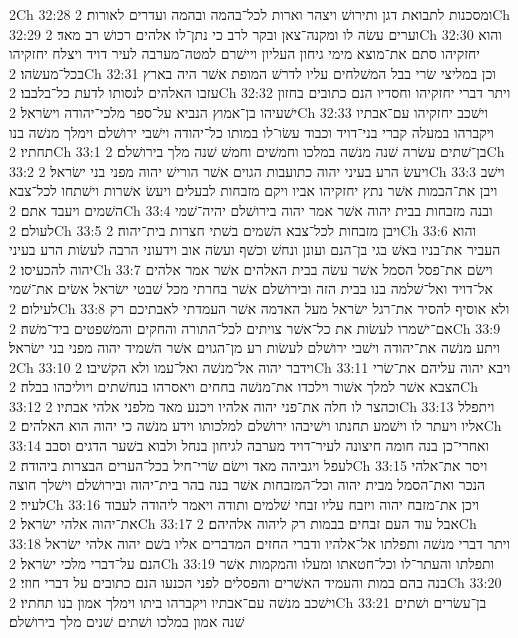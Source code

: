 2Ch 32:28  ומסכנות לתבואת דגן ותירושׁ ויצהר וארות לכל־בהמה ובהמה ועדרים לאורות׃
2Ch 32:29  וערים עשׂה לו ומקנה־צאן ובקר לרב כי נתן־לו אלהים רכושׁ רב מאד׃
2Ch 32:30  והוא יחזקיהו סתם את־מוצא מימי גיחון העליון ויישׁרם למטה־מערבה לעיר דויד ויצלח יחזקיהו בכל־מעשׂהו׃
2Ch 32:31  וכן במליצי שׂרי בבל המשׁלחים עליו לדרשׁ המופת אשׁר היה בארץ עזבו האלהים לנסותו לדעת כל־בלבבו׃
2Ch 32:32  ויתר דברי יחזקיהו וחסדיו הנם כתובים בחזון ישׁעיהו בן־אמוץ הנביא על־ספר מלכי־יהודה וישׂראל׃
2Ch 32:33  וישׁכב יחזקיהו עם־אבתיו ויקברהו במעלה קברי בני־דויד וכבוד עשׂו־לו במותו כל־יהודה וישׁבי ירושׁלם וימלך מנשׁה בנו תחתיו׃
2Ch 33:1  בן־שׁתים עשׂרה שׁנה מנשׁה במלכו וחמשׁים וחמשׁ שׁנה מלך בירושׁלם׃
2Ch 33:2  ויעשׂ הרע בעיני יהוה כתועבות הגוים אשׁר הורישׁ יהוה מפני בני ישׂראל׃
2Ch 33:3  וישׁב ויבן את־הבמות אשׁר נתץ יחזקיהו אביו ויקם מזבחות לבעלים ויעשׂ אשׁרות וישׁתחו לכל־צבא השׁמים ויעבד אתם׃
2Ch 33:4  ובנה מזבחות בבית יהוה אשׁר אמר יהוה בירושׁלם יהיה־שׁמי לעולם׃
2Ch 33:5  ויבן מזבחות לכל־צבא השׁמים בשׁתי חצרות בית־יהוה׃
2Ch 33:6  והוא העביר את־בניו באשׁ בגי בן־הנם ועונן ונחשׁ וכשׁף ועשׂה אוב וידעוני הרבה לעשׂות הרע בעיני יהוה להכעיסו׃
2Ch 33:7  וישׂם את־פסל הסמל אשׁר עשׂה בבית האלהים אשׁר אמר אלהים אל־דויד ואל־שׁלמה בנו בבית הזה ובירושׁלם אשׁר בחרתי מכל שׁבטי ישׂראל אשׂים את־שׁמי לעילום׃
2Ch 33:8  ולא אוסיף להסיר את־רגל ישׂראל מעל האדמה אשׁר העמדתי לאבתיכם רק אם־ישׁמרו לעשׂות את כל־אשׁר צויתים לכל־התורה והחקים והמשׁפטים ביד־משׁה׃
2Ch 33:9  ויתע מנשׁה את־יהודה וישׁבי ירושׁלם לעשׂות רע מן־הגוים אשׁר השׁמיד יהוה מפני בני ישׂראל׃
2Ch 33:10  וידבר יהוה אל־מנשׁה ואל־עמו ולא הקשׁיבו׃
2Ch 33:11  ויבא יהוה עליהם את־שׂרי הצבא אשׁר למלך אשׁור וילכדו את־מנשׁה בחחים ויאסרהו בנחשׁתים ויוליכהו בבלה׃
2Ch 33:12  וכהצר לו חלה את־פני יהוה אלהיו ויכנע מאד מלפני אלהי אבתיו׃
2Ch 33:13  ויתפלל אליו ויעתר לו וישׁמע תחנתו וישׁיבהו ירושׁלם למלכותו וידע מנשׁה כי יהוה הוא האלהים׃
2Ch 33:14  ואחרי־כן בנה חומה חיצונה לעיר־דויד מערבה לגיחון בנחל ולבוא בשׁער הדגים וסבב לעפל ויגביהה מאד וישׂם שׂרי־חיל בכל־הערים הבצרות ביהודה׃
2Ch 33:15  ויסר את־אלהי הנכר ואת־הסמל מבית יהוה וכל־המזבחות אשׁר בנה בהר בית־יהוה ובירושׁלם וישׁלך חוצה לעיר׃
2Ch 33:16  ויכן את־מזבח יהוה ויזבח עליו זבחי שׁלמים ותודה ויאמר ליהודה לעבוד את־יהוה אלהי ישׂראל׃
2Ch 33:17  אבל עוד העם זבחים בבמות רק ליהוה אלהיהם׃
2Ch 33:18  ויתר דברי מנשׁה ותפלתו אל־אלהיו ודברי החזים המדברים אליו בשׁם יהוה אלהי ישׂראל הנם על־דברי מלכי ישׂראל׃
2Ch 33:19  ותפלתו והעתר־לו וכל־חטאתו ומעלו והמקמות אשׁר בנה בהם במות והעמיד האשׁרים והפסלים לפני הכנעו הנם כתובים על דברי חוזי׃
2Ch 33:20  וישׁכב מנשׁה עם־אבתיו ויקברהו ביתו וימלך אמון בנו תחתיו׃
2Ch 33:21  בן־עשׂרים ושׁתים שׁנה אמון במלכו ושׁתים שׁנים מלך בירושׁלם׃
